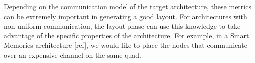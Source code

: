 Depending on the communication model of the target architecture, these
metrics can be extremely important in generating a good layout.  For
architectures with non-uniform communication, the layout phase can use
this knowledge to take advantage of the specific properties of the
architecture.  For example, in a Smart Memories architecture [ref], we
would like to place the nodes that communicate over an expensive
channel on the same quad.

